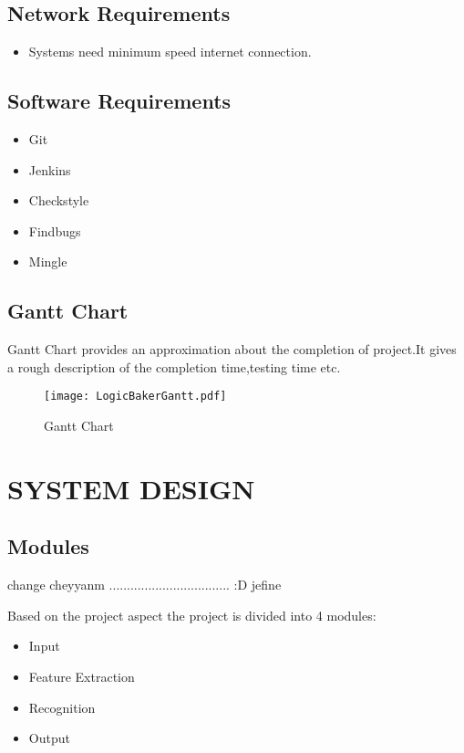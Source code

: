\documentclass[12pt,a4paper,oneside]{report}
\begin{document}
 
 \pagebreak
\section{Network Requirements}  
\begin{itemize}
\item Systems need minimum speed internet connection.
\end{itemize}
\section{Software Requirements}
\begin{itemize}
\item Git
\item Jenkins
\item Checkstyle
\item Findbugs
\item Mingle

\end{itemize}
\pagebreak
\section{Gantt Chart}
Gantt Chart provides an approximation about the completion of project.It gives a rough description of the completion time,testing time etc.
\begin{figure}[h]
\begin{center}
\texttt{[image: LogicBakerGantt.pdf]}
\caption{Gantt Chart}
\end{center}
\end{figure}
\chapter{SYSTEM DESIGN}
\section{Modules}  
change cheyyanm .................................. :D jefine

Based on the project aspect the project is divided into 4 modules:
\begin{itemize}  
\item Input
\item Feature Extraction
\item Recognition
\item Output
\end{itemize}
\end{document}
